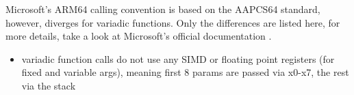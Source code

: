 Microsoft's ARM64 calling convention is based on the AAPCS64 standard, however, diverges for variadic functions.
Only the differences are listed here, for more details, take a look at Microsoft's official documentation \cite{MicrosoftARM64}.

\begin{itemize}
\item variadic function calls do not use any SIMD or floating point registers (for fixed and variable args), meaning first 8 params are passed via x0-x7, the rest via the stack
\end{itemize}

